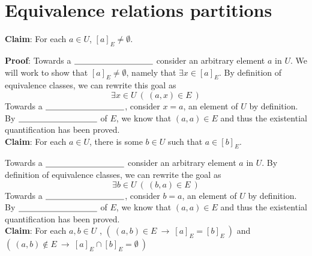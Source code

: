 \documentclass[12pt, oneside]{article}
\begin{document}
\section*{Equivalence relations partitions}




{\bf Claim}: For each  $a \in U$, $[a]_{E}  \neq  \emptyset$.

{\bf Proof}: Towards a $\underline{\phantom{\hspace{1.3in}}}$ 
consider an arbitrary element $a$ in $U$. 
We will work to show that $[a]_E \neq \emptyset$, namely that $\exists x \in [a]_E$.
By definition of equivalence classes, we can rewrite this goal as 
$$\exists x \in U ~( ~(a,x) \in E~)$$ 
Towards a $\underline{\phantom{\hspace{1.3in}}}$, consider $x = a$, 
an element of $U$ by definition. By $\underline{\phantom{\hspace{1.3in}}}$ of $E$, 
we know that $(a,a) \in E$  and thus the existential quantification has been proved.\\


{\bf Claim}: For each $a \in U$, there is some $b \in U$  such that $a \in [b]_{E}$.

Towards a $\underline{\phantom{\hspace{1.3in}}}$ 
consider an arbitrary element $a$ in $U$. By definition of equivalence classes, 
we can rewrite the goal as 
$$\exists b \in U ~( ~(b,a) \in E~)$$
Towards a $\underline{\phantom{\hspace{1.3in}}}$, consider $b = a$, 
an element of $U$ by definition. By $\underline{\phantom{\hspace{1.3in}}}$  of $E$, 
we know that $(a,a) \in E$  and thus the existential quantification has been proved. \\
 
{\bf Claim}: For each  $a,b  \in U$ , $(~(a,b)  \in  E ~\to ~ [a]_{E}  = [b]_{E}~)$
and  $(~(a,b)  \notin  E ~\to ~ [a]_{E} \cap[b]_{E} = \emptyset~)$

\phantom{Let $a,b$ be arbitrary. For first goal, assume towards
direct proof that $(a,b) \in E$. To show $[a]_E = [b]_E$ 
first consider arbitrary element $x$ in $[a]_E$. By definition
$(a,x) \in E$ so by symmetry, $(x,a) \in E$ and by 
transitivity with assumption, $(x,b)\in E$. Thus, by definition
of equivalence class, $x \in [b]_E$. Similarly, take arbitrary
element $y \in [b]_E$. By definition $(y,b) \in E$ 
and applying symmetry to assumption, we have $(b,a) \in E$
so by transitivity $(y,a) \in E$ and $y \in[a]_E$, as required
to complete the proof of set equality. For the second goal, 
assume (towards a proof by contrapositive) that $[a]_E \cap [b]_E 
\neq \emptyset$. Then there is a witness $w \in [a]_E \cap [b]_E$.
By definition of equivalence classes $(a,w) \in E$ and $(b,w) \in E$.
By symmetry, we have $(w,b) \in E$ so by transitivity $(a,b) \in E$,
as required.}
\end{document}
